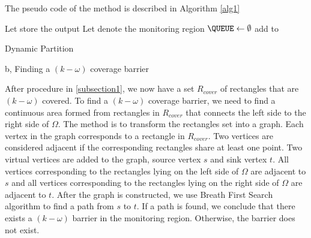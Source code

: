 The pseudo code of the method is described in Algorithm \ref{alg1}
%

%
\begin{center}
	\begin{minipage}{.7\linewidth}
		\begin{algorithm}[H]
			\DontPrintSemicolon
			\SetAlgoLined
			\newcommand{\forcondi}[2]{\ensuremath{#1 \in #2}}
			\BlankLine
			\BlankLine
			\BlankLine
			Let \coveredNodes store the output\;
			Let \root denote the monitoring region\;
			$\QUEUE\gets\emptyset$\;
			add \root to \QUEUE \;
			\caption{Dynamic Partition}
			\label{alg1}
		\end{algorithm}
	\end{minipage}
\end{center}

b, Finding a $(k-\omega)$ coverage barrier

After procedure in \ref{subsection1}, we now have a set $ R_{cover} $ of rectangles that are $(k-\omega)$ covered. To find a $(k-\omega)$ coverage barrier, we need to find a continuous area formed from rectangles in $R_{cover}$ that connects the left side to the right side of $\Omega$. The method is to transform the rectangles set into a graph. Each vertex in the graph corresponds to a rectangle in $ R_{cover} $. Two vertices are considered adjacent if the corresponding rectangles share at least one point. Two virtual vertices are added to the graph, source vertex $ s $ and sink vertex $ t $. All vertices corresponding to the rectangles lying on the left side of $\Omega$ are adjacent to $s$ and all vertices corresponding to the rectangles lying on the right side of $\Omega$ are adjacent to $t$. After the graph is constructed, we use Breath First Search algorithm to find a path from $s$ to $t$. If a path is found, we conclude that there exists a $(k-\omega)$ barrier in the monitoring region. Otherwise, the barrier does not exist.
